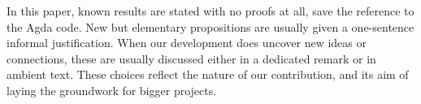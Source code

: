 In this paper, known results are stated with no proofs at all, save the reference to the Agda code. \cite{FPLA}
New but elementary propositions are usually given a one-sentence informal justification.
When our development does uncover new ideas or connections,
these are usually discussed either in a dedicated remark or in ambient text.
These choices reflect the nature of our contribution, and its aim of laying the
groundwork for bigger projects.
